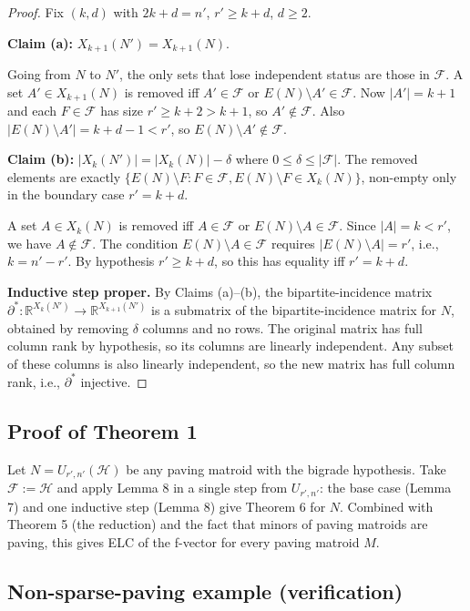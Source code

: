 \documentclass[11pt]{article}
\theoremstyle{definition}
\renewcommand{\H}{\mathcal{H}}
\newcommand{\F}{\mathcal{F}}
\begin{document}
\begin{proof}
Fix $(k, d)$ with $2k + d = n'$, $r' \geq k + d$, $d \geq 2$.

\textbf{Claim (a):} $X_{k+1}(N') = X_{k+1}(N)$.

Going from $N$ to $N'$, the only sets that lose independent status are those in $\F$. A set $A' \in X_{k+1}(N)$ is removed iff $A' \in \F$ or $E(N) \setminus A' \in \F$. Now $|A'| = k + 1$ and each $F \in \F$ has size $r' \geq k + 2 > k + 1$, so $A' \notin \F$. Also $|E(N) \setminus A'| = k + d - 1 < r'$, so $E(N) \setminus A' \notin \F$.

\textbf{Claim (b):} $|X_k(N')| = |X_k(N)| - \delta$ where $0 \leq \delta \leq |\F|$. The removed elements are exactly $\{E(N) \setminus F : F \in \F, E(N) \setminus F \in X_k(N)\}$, non-empty only in the boundary case $r' = k + d$.

A set $A \in X_k(N)$ is removed iff $A \in \F$ or $E(N) \setminus A \in \F$. Since $|A| = k < r'$, we have $A \notin \F$. The condition $E(N) \setminus A \in \F$ requires $|E(N) \setminus A| = r'$, i.e., $k = n' - r'$. By hypothesis $r' \geq k + d$, so this has equality iff $r' = k + d$.

\textbf{Inductive step proper.} By Claims (a)--(b), the bipartite-incidence matrix $\partial^* : \mathbb{R}^{X_k(N')} \to \mathbb{R}^{X_{k+1}(N')}$ is a submatrix of the bipartite-incidence matrix for $N$, obtained by removing $\delta$ columns and no rows. The original matrix has full column rank by hypothesis, so its columns are linearly independent. Any subset of these columns is also linearly independent, so the new matrix has full column rank, i.e., $\partial^*$ injective.
\end{proof}

\subsection{Proof of Theorem 1}

Let $N = U_{r', n'}(\H)$ be any paving matroid with the bigrade hypothesis. Take $\F := \H$ and apply Lemma 8 in a single step from $U_{r', n'}$: the base case (Lemma 7) and one inductive step (Lemma 8) give Theorem 6 for $N$. Combined with Theorem 5 (the reduction) and the fact that minors of paving matroids are paving, this gives ELC of the f-vector for every paving matroid $M$.

\subsection{Non-sparse-paving example (verification)}
\end{document}
